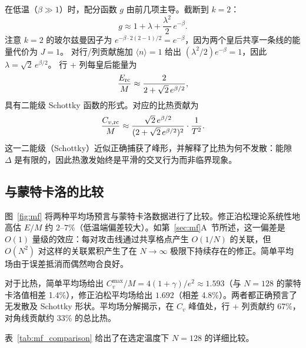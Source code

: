 \documentclass[aps, pre, reprint, amsmath, amssymb, superscriptaddress, floatfix]{revtex4-2}
\begin{document}
在低温（$\beta \gg 1$）时，配分函数 $g$ 由前几项主导。截断到 $k = 2$：
\begin{equation}
  g \approx 1 + \lambda + \frac{\lambda^2}{2}\,e^{-\beta}.
  \label{eq:g_trunc}
\end{equation}
注意 $k = 2$ 的玻尔兹曼因子为 $e^{-\beta \cdot 2(2-1)/2} = e^{-\beta}$，因为两个皇后共享一条线的能量代价为 $J = 1$。
对行/列贡献施加 $\langle n \rangle = 1$ 给出 $(\lambda^2/2)e^{-\beta} = 1$，因此 $\lambda = \sqrt{2}\,e^{\beta/2}$。
行 + 列每皇后能量为
\begin{equation}
  \frac{E_{\rm rc}}{M} \approx \frac{2}{2 + \sqrt{2}\,e^{\beta/2}},
  \label{eq:Erc_approx}
\end{equation}
具有二能级 Schottky 函数的形式。对应的比热贡献为
\begin{equation}
  \frac{C_{v,\rm rc}}{M} \approx
  \frac{\sqrt{2}\,e^{\beta/2}}{(2 + \sqrt{2}\,e^{\beta/2})^2}
  \cdot \frac{1}{T^2}.
  \label{eq:Cv_rc_approx}
\end{equation}
这一二能级（Schottky）近似正确捕获了峰形，并解释了比热为何不发散：能隙 $\Delta$ 是有限的，因此热激发始终是平滑的交叉行为而非临界现象。

\subsection{与蒙特卡洛的比较}

图~\ref{fig:mf} 将两种平均场预言与蒙特卡洛数据进行了比较。修正泊松理论系统性地高估 $E/M$ 约 $2$--$7\%$（低温端偏差较大）。如第~\ref{sec:mf}A~节所述，这一偏差是 $O(1)$ 量级的效应：每对攻击线通过共享格点产生 $O(1/N)$ 的关联，但 $O(N^2)$ 对这样的关联累积产生了在 $N \to \infty$ 极限下持续存在的修正。简单平均场由于误差抵消而偶然吻合良好。

对于比热，简单平均场给出 $C_v^{\max}/M = 4(1+\gamma)/e^2 \approx 1.593$（与 $N = 128$ 的蒙特卡洛值相差 1.4\%），修正泊松平均场给出 $1.692$（相差 4.8\%）。两者都正确预言了无发散及 Schottky 形状。平均场分解揭示，在 $C_v$ 峰值处，行 + 列贡献约 $67\%$，对角线贡献约 $33\%$ 的总比热。

表~\ref{tab:mf_comparison} 给出了在选定温度下 $N = 128$ 的详细比较。
\end{document}
